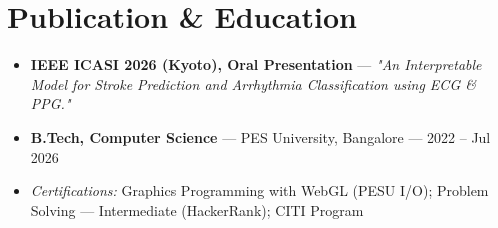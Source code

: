 \documentclass[10pt,a4paper]{article}
\begin{document}
\section*{Publication \& Education}
\begin{itemize}
\item \textbf{IEEE ICASI 2026 (Kyoto), Oral Presentation} --- \textit{"An Interpretable Model for Stroke Prediction and Arrhythmia Classification using ECG \& PPG."}
\item \textbf{B.Tech, Computer Science} --- PES University, Bangalore --- 2022 -- Jul 2026
\item \textit{Certifications:} Graphics Programming with WebGL (PESU I/O); Problem Solving --- Intermediate (HackerRank); CITI Program
\end{itemize}
\end{document}
